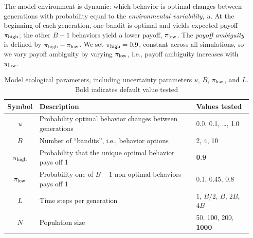 \documentclass[letterpaper,11.5pt]{scrartcl}
\begin{document}
The model environment is dynamic: which behavior is optimal changes between
generations with probability equal to the \emph{environmental variability}, $u$.
At the beginning of each generation, one bandit is optimal and yields expected
payoff $\pi_{\mathrm{high}}$; the other $B-1$ behaviors yield a lower payoff, $\pi_{\mathrm{low}}$. 
The \emph{payoff ambiguity} is defined by $\pi_{\mathrm{high}} - \pi_{\mathrm{low}}$. 
We set $\pi_{\mathrm{high}} = 0.9$, constant across all simulations, so we vary
payoff ambiguity by varying $\pi_{\mathrm{low}}$, i.e., payoff ambiguity increases with
$\pi_{\mathrm{low}}$.  


\vspace{2em}
\begin{table}[h]
\caption{Model ecological parameters, including uncertainty parameters $u$, $B$,
$\pi_{\mathrm{low}}$, and $L$. Bold indicates default value tested} %
    \label{tab:uncertaintyParameters}
    \centering %
    \begin{tabular}{cp{4.0in}p{1.25in}} \toprule

        Symbol & Description & Values tested \\ 

        \midrule  

        $u$    & Probability optimal behavior changes between generations 
               & 0.0, 0.1, \ldots, 1.0 \\

        $B$       & Number of ``bandits'', i.e., behavior options
                  & 2, 4, 10 \\

        $\pi_{\mathrm{high}}$ & Probability that the unique optimal behavior pays off 1 
                & \textbf{0.9} \\

        $\pi_{\mathrm{low}}$ & Probability one of $B - 1$ non-optimal behaviors pays off 1 
                 & 0.1, 0.45, 0.8 \\ 

        $L$    & Time steps per generation & 1, $B/2$, $B$, $2B$, $4B$ \\

        $N$    & Population size
                 & 50, 100, 200, \textbf{1000} \\
               
        \bottomrule
        \end{tabular} 
\end{table}
\end{document}
